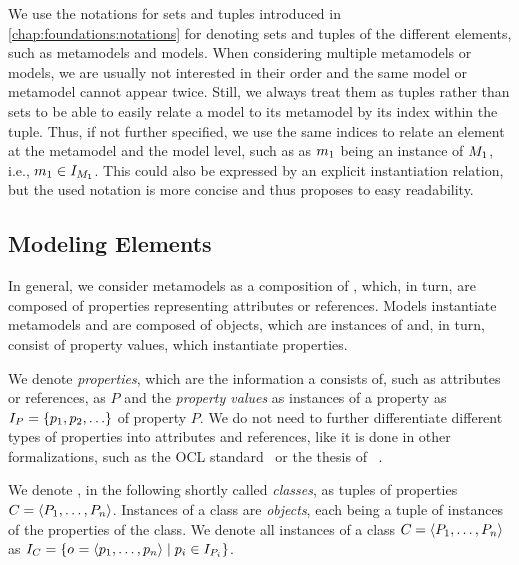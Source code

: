 We use the notations for sets and tuples introduced in \autoref{chap:foundations:notations} for denoting sets and tuples of the different elements, such as metamodels and models.
When considering multiple metamodels or models, we are usually not interested in their order and the same model or metamodel cannot appear twice.
Still, we always treat them as tuples rather than sets to be able to easily relate a model to its metamodel by its index within the tuple.
Thus, if not further specified, we use the same indices to relate an element at the metamodel and the model level, such as as $\model{m}{1}$ being an instance of $\metamodel{M}{1}$, i.e., $\model{m}{1} \in \metamodelinstanceset{M}{1}$.
This could also be expressed by an explicit instantiation relation, but the used notation is more concise and thus proposes to easy readability.


\subsection{Modeling Elements}

In general, we consider metamodels as a composition of \metaclasses, which, in turn, are composed of properties representing attributes or references.
Models instantiate metamodels and are composed of objects, which are instances of \metaclasses and, in turn, consist of property values, which instantiate properties.

We denote \emph{properties}, which are the information a \metaclass consists of, such as attributes or references, as $P$ and the \emph{property values} as instances of a property as $\instances{P} = \setted{p_1, p_2, \dots}$ of property $P$. 
We do not need to further differentiate different types of properties into attributes and references, like it is done in other formalizations, such as the \gls{OCL} standard~\cite[A.1]{ocl} or the thesis of \citeauthor{kramer2017a}~\cite[Sec.~2.3.2]{kramer2017a}.

We denote \emph{\metaclasses}, in the following shortly called \emph{classes}, as tuples of properties $\class{C}{} = \tupled{P_1, \dots, P_n}$. 
Instances of a class are \emph{objects}, each being a tuple of instances of the properties of the class.
We denote all instances of a class $\class{C}{} = \tupled{P_1, \dots, P_n}$ as $\instances{\class{C}{}} = \setted{\object{o}{} = \tupled{p_1, \dots, p_n} \mid p_i \in \instances{P_i}}$.

